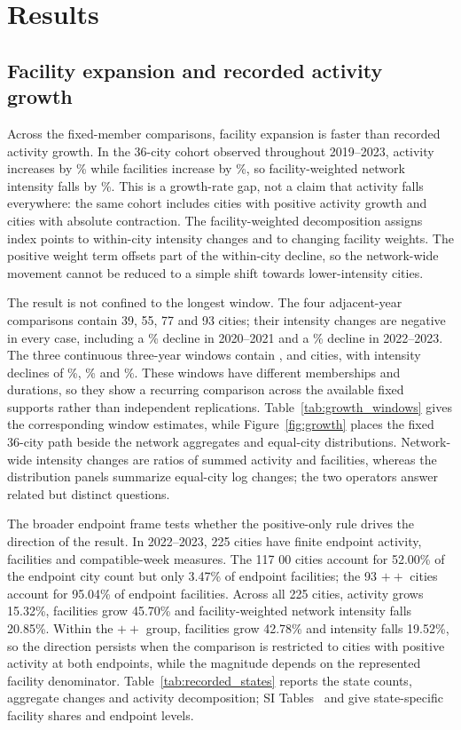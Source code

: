 \section{Results}

\subsection{Facility expansion and recorded activity growth}
Across the fixed-member comparisons, facility expansion is faster than recorded activity growth. In the 36-city cohort observed throughout 2019--2023, activity increases by \AChange\% while facilities increase by \NChange\%, so facility-weighted network intensity falls by \IDecline\%. This is a growth-rate gap, not a claim that activity falls everywhere: the same cohort includes cities with positive activity growth and cities with absolute contraction. The facility-weighted decomposition assigns \WithinChange{} index points to within-city intensity changes and \WeightChange{} to changing facility weights. The positive weight term offsets part of the within-city decline, so the network-wide movement cannot be reduced to a simple shift towards lower-intensity cities.

The result is not confined to the longest window. The four adjacent-year comparisons contain 39, 55, 77 and 93 cities; their intensity changes are negative in every case, including a \MiddleIDecline\% decline in 2020--2021 and a \RecentIDecline\% decline in 2022--2023. The three continuous three-year windows contain \ThreeEarlyN, \ThreeMiddleN{} and \ThreeLateN{} cities, with intensity declines of \ThreeEarlyDecline\%, \ThreeMiddleDecline\% and \ThreeLateDecline\%. These windows have different memberships and durations, so they show a recurring comparison across the available fixed supports rather than independent replications. Table~\ref{tab:growth_windows} gives the corresponding window estimates, while Figure~\ref{fig:growth} places the fixed 36-city path beside the network aggregates and equal-city distributions. Network-wide intensity changes are ratios of summed activity and facilities, whereas the distribution panels summarize equal-city log changes; the two operators answer related but distinct questions.

The broader endpoint frame tests whether the positive-only rule drives the direction of the result. In 2022--2023, 225 cities have finite endpoint activity, facilities and compatible-week measures. The 117 $00$ cities account for 52.00\% of the endpoint city count but only 3.47\% of endpoint facilities; the 93 $++$ cities account for 95.04\% of endpoint facilities. Across all 225 cities, activity grows 15.32\%, facilities grow 45.70\% and facility-weighted network intensity falls 20.85\%. Within the $++$ group, facilities grow 42.78\% and intensity falls 19.52\%, so the direction persists when the comparison is restricted to cities with positive activity at both endpoints, while the magnitude depends on the represented facility denominator. Table~\ref{tab:recorded_states} reports the state counts, aggregate changes and activity decomposition; SI Tables~ and  give state-specific facility shares and endpoint levels.

